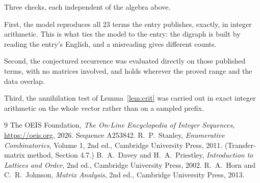 \documentclass[11pt,a4paper]{article}
\theoremstyle{plain}
\theoremstyle{definition}
\begin{document}
Three checks, each independent of the algebra above.

First, the model reproduces all $23$ terms the entry publishes, exactly, in integer
arithmetic. This is what ties the model to the entry: the digraph is built by reading the
entry's English, and a misreading gives different counts.

Second, the conjectured recurrence was evaluated directly on those published terms, with no
matrices involved, and holds wherever the proved range and the data overlap.

Third, the annihilation test of Lemma~\ref{lem:crit} was carried out in exact integer
arithmetic on the whole vector rather than on a sampled prefix.

\begin{thebibliography}{9}
 The OEIS Foundation, \emph{The On-Line Encyclopedia of Integer
Sequences}, \url{https://oeis.org}, 2026. Sequence A253842.
 R.~P.~Stanley, \emph{Enumerative Combinatorics}, Volume 1, 2nd ed.,
Cambridge University Press, 2011. (Transfer-matrix method, Section 4.7.)
 B.~A.~Davey and H.~A.~Priestley, \emph{Introduction to Lattices and
Order}, 2nd ed., Cambridge University Press, 2002.
 R.~A.~Horn and C.~R.~Johnson, \emph{Matrix Analysis}, 2nd ed., Cambridge
University Press, 2013.
\end{thebibliography}
\end{document}
